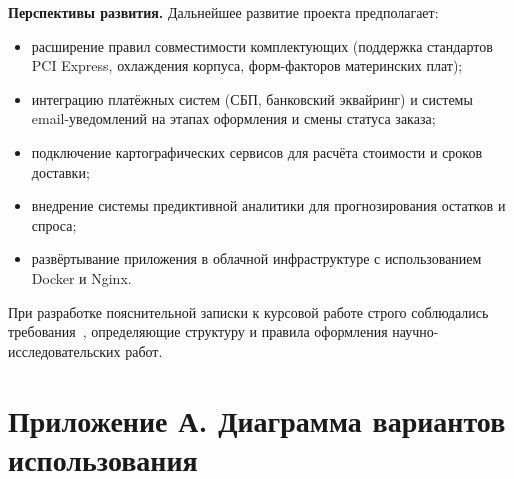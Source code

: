 \documentclass[14pt, a4paper]{extarticle}
\begin{document}
\textbf{Перспективы развития.} Дальнейшее развитие проекта предполагает:
\begin{itemize}
    \item расширение правил совместимости комплектующих (поддержка стандартов PCI Express, охлаждения корпуса, форм-факторов материнских плат);
    \item интеграцию платёжных систем (СБП, банковский эквайринг) и системы email-уведомлений на этапах оформления и смены статуса заказа;
    \item подключение картографических сервисов для расчёта стоимости и сроков доставки;
    \item внедрение системы предиктивной аналитики для прогнозирования остатков и спроса;
    \item развёртывание приложения в облачной инфраструктуре с использованием Docker и Nginx.
\end{itemize}

При разработке пояснительной записки к курсовой работе строго соблюдались требования~\cite{gost_report}, определяющие структуру и правила оформления научно-исследовательских работ.




\startappendix

\section*{Приложение А. Диаграмма вариантов использования}
\end{document}
